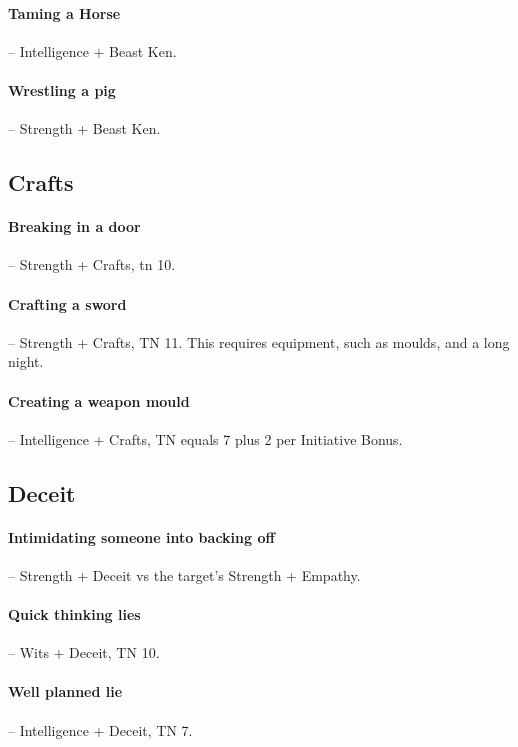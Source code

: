 \begin{multicols}{2}
\paragraph{Taming a Horse} -- Intelligence + Beast Ken.

\paragraph{Wrestling a pig} -- Strength + Beast Ken.

\subsection{Crafts}

\paragraph{Breaking in a door} -- Strength + Crafts, \gls{tn} 10.

\paragraph{Crafting a sword} -- Strength + Crafts, TN 11.
This requires equipment, such as moulds, and a long night.

\paragraph{Creating a weapon mould} -- Intelligence + Crafts, TN equals 7 plus 2 per Initiative Bonus.

\subsection{Deceit}

\paragraph{Intimidating someone into backing off} -- Strength + Deceit vs the target's Strength + Empathy.

\paragraph{Quick thinking lies} -- Wits + Deceit, TN 10.

\paragraph{Well planned lie} -- Intelligence + Deceit, TN 7.


\end{multicols}
